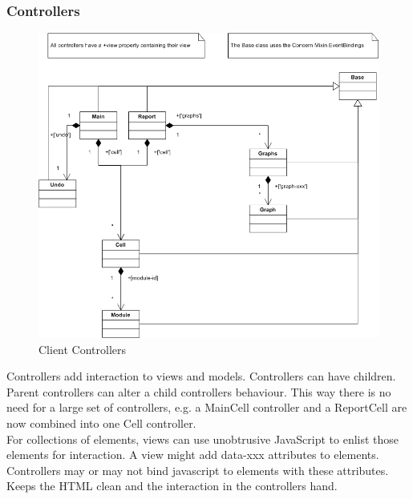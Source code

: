 \documentclass{report}
\begin{document}
				\subsubsection{Controllers}
					\begin{figure}[htb]
						\begin{center}
							\includegraphics[width=\linewidth]{controllers.png}
							\caption{Client Controllers}
							\label{fig: cmodels}
						\end{center}
					\end{figure}	
					Controllers add interaction to views and models. Controllers can have children. Parent controllers can alter a child controllers behaviour. This way there is no need for a large set of controllers, e.g. a MainCell controller and a ReportCell are now combined into one Cell controller. \\
					For collections of elements, views can use unobtrusive JavaScript to enlist those elements for interaction. A view might add data-xxx attributes to elements. Controllers may or may not bind javascript to elements with these attributes. Keeps the HTML clean and the interaction in the controllers hand. 
					
\end{document}
